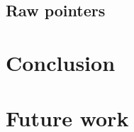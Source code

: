 \documentclass[twocolumn]{article}
\begin{document}
\subsection{Raw pointers}
\label{raw-pointer}
\section{Conclusion}
\section{Future work}







\end{document}
